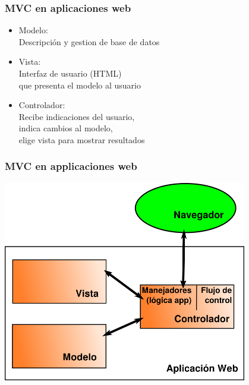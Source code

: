 
\begin{frame}
\frametitle{MVC en aplicaciones web}

{\Large
\begin{itemize}
\item Modelo: \\ Descripción y gestion de base de datos
\item Vista: \\ Interfaz de usuario (HTML) \\
  que presenta el modelo al usuario
\item Controlador: \\ Recibe indicaciones del usuario, \\
  indica cambios al modelo, \\
  elige vista para mostrar resultados
\end{itemize}
}

\end{frame}


\begin{frame}
\frametitle{MVC en applicaciones web}

\begin{center}
\includegraphics[width=0.8\textwidth]{figs/mvc-basic}
\end{center}
\end{frame}




